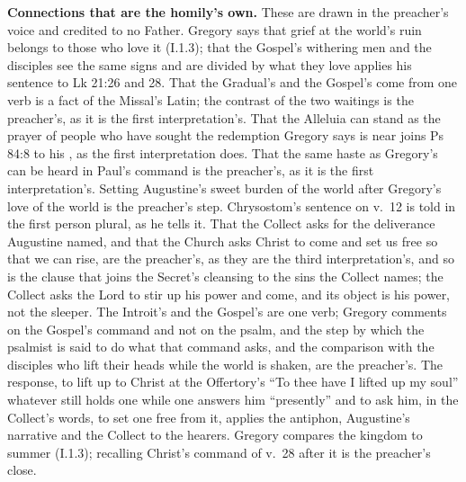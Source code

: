 {\textbf{Connections that are the homily's own.} These are drawn in the
preacher's voice and credited to no Father. Gregory says that grief at the
world's ruin belongs to those who love it (I.1.3); that the Gospel's withering
men and the disciples see the same signs and are divided by what they love
applies his sentence to Lk 21:26 and 28. That the Gradual's 
and the Gospel's  come from one verb is a fact of the
Missal's Latin; the contrast of the two waitings is the preacher's, as it is
the first interpretation's. That the Alleluia can stand as the prayer of
people who have sought the redemption Gregory says is near joins Ps 84:8 to
his , as the first interpretation does. That the same haste
as Gregory's  can be heard in Paul's
command is the preacher's, as it is the first interpretation's. Setting
Augustine's sweet burden of the world after Gregory's love of the world is the
preacher's step. Chrysostom's sentence on v.~12 is told in the first person
plural, as he tells it. That the Collect asks for the deliverance Augustine
named, and that the Church asks Christ to come and set us free so that we can
rise, are the preacher's, as they are the third interpretation's, and so is
the clause that joins the Secret's cleansing to the sins the Collect names;
the Collect asks the Lord to stir up his power and come, and its object is his
power, not the sleeper. The Introit's  and the Gospel's
 are one verb; Gregory comments on the Gospel's command and not
on the psalm, and the step by which the psalmist is said to do what that
command asks, and the comparison with the disciples who lift their heads while
the world is shaken, are the preacher's. The response, to lift up to Christ at
the Offertory's ``To thee have I lifted up my soul'' whatever still holds one
while one answers him ``presently'' and to ask him, in the Collect's words, to
set one free from it, applies the antiphon, Augustine's narrative and the
Collect to the hearers. Gregory compares the kingdom to summer (I.1.3);
recalling Christ's command of v.~28 after it is the preacher's close.

}
